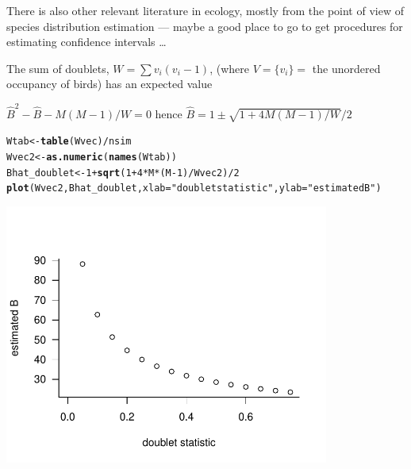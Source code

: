 \documentclass{article}\usepackage[]{graphicx}\usepackage[]{color}
\makeatletter
\newcommand{\hlnum}[1]{\textcolor[rgb]{0.686,0.059,0.569}{#1}}%
\newcommand{\hlstr}[1]{\textcolor[rgb]{0.192,0.494,0.8}{#1}}%
\newcommand{\hlopt}[1]{\textcolor[rgb]{0,0,0}{#1}}%
\newcommand{\hlstd}[1]{\textcolor[rgb]{0.345,0.345,0.345}{#1}}%
\newcommand{\hlkwb}[1]{\textcolor[rgb]{0.69,0.353,0.396}{#1}}%
\newcommand{\hlkwc}[1]{\textcolor[rgb]{0.333,0.667,0.333}{#1}}%
\newcommand{\hlkwd}[1]{\textcolor[rgb]{0.737,0.353,0.396}{\textbf{#1}}}%
\newenvironment{kframe}{%
 \def\at@end@of@kframe{}%
 \ifinner\ifhmode%
  \def\at@end@of@kframe{\end{minipage}}%
  \begin{minipage}{\columnwidth}%
 \fi\fi%
 \def\FrameCommand##1{\hskip\@totalleftmargin \hskip-\fboxsep
 \colorbox{shadecolor}{##1}\hskip-\fboxsep
     \hskip-\linewidth \hskip-\@totalleftmargin \hskip\columnwidth}%
 \MakeFramed {\advance\hsize-\width
   \@totalleftmargin\z@ \linewidth\hsize
   \@setminipage}}%
 {\par\unskip\endMakeFramed%
 \at@end@of@kframe}
\newenvironment{knitrout}{}{} %
\makeatother
\begin{document}
There is also other relevant literature in ecology, mostly from
the point of view of species distribution estimation
\citep{good_population_1953,chao_estimating_1992} --- maybe
a good place to go to get procedures for estimating confidence
intervals \ldots

The sum of doublets, $W=\sum v_i (v_i-1)$, (where $V = \{v_i\} = $ the unordered occupancy of birds) has an
expected value

$\hat B^2 - \hat B - M(M-1)/W = 0$
hence $\hat B = 1 \pm \sqrt{1+4 M(M-1)/W}/2$
\begin{knitrout}
\color{fgcolor}\begin{kframe}
\begin{alltt}
\hlstd{Wtab} \hlkwb{<-} \hlkwd{table}\hlstd{(Wvec)}\hlopt{/}\hlstd{nsim}
\hlstd{Wvec2} \hlkwb{<-} \hlkwd{as.numeric}\hlstd{(}\hlkwd{names}\hlstd{(Wtab))}
\hlstd{Bhat_doublet} \hlkwb{<-} \hlnum{1} \hlopt{+} \hlkwd{sqrt}\hlstd{(}\hlnum{1}\hlopt{+}\hlnum{4}\hlopt{*}\hlstd{M}\hlopt{*}\hlstd{(M}\hlopt{-}\hlnum{1}\hlstd{)}\hlopt{/}\hlstd{Wvec2)}\hlopt{/}\hlnum{2}
\hlkwd{plot}\hlstd{(Wvec2,Bhat_doublet,}\hlkwc{xlab}\hlstd{=}\hlstr{"doublet statistic"}\hlstd{,}\hlkwc{ylab}\hlstd{=}\hlstr{"estimated B"}\hlstd{)}
\end{alltt}
\end{kframe}
\includegraphics[width=0.8\textwidth]{figure/unnamed-chunk-2-1} 

\end{knitrout}
\end{document}
